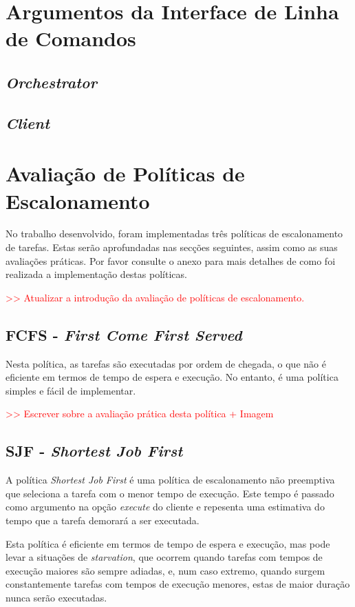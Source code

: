 \documentclass[a4paper,11pt]{scrreprt}
\begin{document}
\chapter{Argumentos da Interface de Linha de Comandos}
    \section{\textit{Orchestrator}}
    \section{\textit{Client}}

\chapter{Avaliação de Políticas de Escalonamento}
    No trabalho desenvolvido, foram implementadas três políticas de escalonamento de tarefas.
    Estas serão aprofundadas nas secções seguintes, assim como as suas avaliações práticas.
    Por favor consulte o anexo  para mais detalhes de como foi realizada
    a implementação destas políticas.

    \textcolor{red}{>> Atualizar a introdução da avaliação de políticas de escalonamento.}
    \section{\textbf{FCFS} - \textit{First Come First Served}}
        Nesta política, as tarefas são executadas por ordem de chegada, o que não é
        eficiente em termos de tempo de espera e execução. No entanto, é uma política
        simples e fácil de implementar.

        \textcolor{red}{>> Escrever sobre a avaliação prática desta política + Imagem}
    \section{\textbf{SJF} - \textit{Shortest Job First}}
        A política \textit{Shortest Job First} é uma política de escalonamento não preemptiva
        que seleciona a tarefa com o menor tempo de execução. Este tempo é passado como
        argumento na opção \textit{execute} do cliente e repesenta uma estimativa do tempo
        que a tarefa demorará a ser executada.

        Esta política é eficiente em termos de tempo de espera e execução, mas pode levar
        a situações de \textit{starvation}, que ocorrem quando tarefas com tempos de execução
        maiores são sempre adiadas, e, num caso extremo, quando surgem constantemente tarefas
        com tempos de execução menores, estas de maior duração nunca serão executadas.
\end{document}
